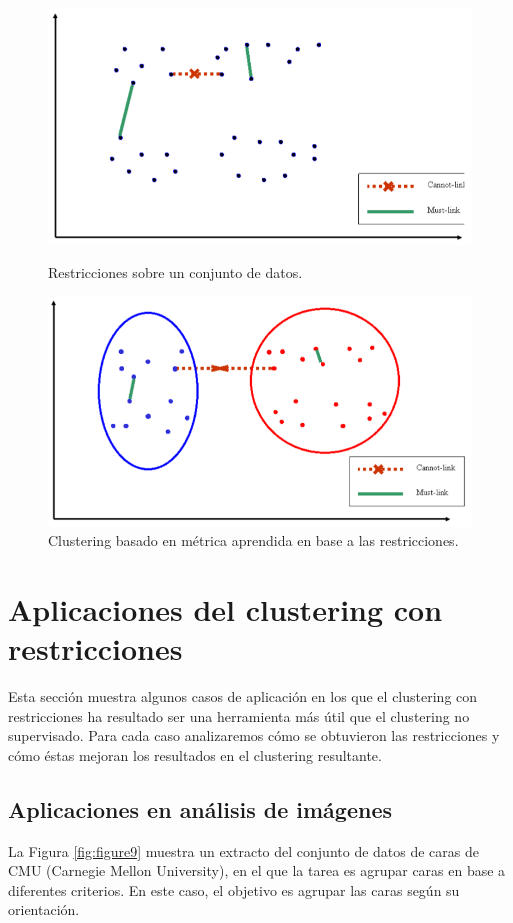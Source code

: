\begin{figure}[bth]
	\myfloatalign
	{\includegraphics[width=.6\linewidth]{imagenes/c3/InputInstancesAndConst2}
	\caption[Restricciones sobre un conjunto de datos.]{Restricciones sobre un conjunto de datos. \cite{Survey:2007}} \label{fig:figure7}
	}
	{\includegraphics[width=.6\linewidth]{imagenes/c3/MetricaAprendida}
	\caption[Clustering basado en métrica aprendida en base a las restricciones.]{Clustering basado en métrica aprendida en base a las restricciones. \cite{Survey:2007}} \label{fig:figure8}
	}
\end{figure}

\section{Aplicaciones del clustering con restricciones} 

Esta sección muestra algunos casos de aplicación en los que el clustering con restricciones ha resultado ser una herramienta más útil que el clustering no supervisado. Para cada caso analizaremos cómo se obtuvieron las restricciones y cómo éstas mejoran los resultados en el clustering resultante. 

\subsection{Aplicaciones en análisis de imágenes}

La Figura \ref{fig:figure9} muestra un extracto del conjunto de datos de caras de  CMU (Carnegie Mellon University), en el que la tarea es agrupar caras en base a diferentes criterios. En este caso, el objetivo es agrupar las caras según su orientación.

